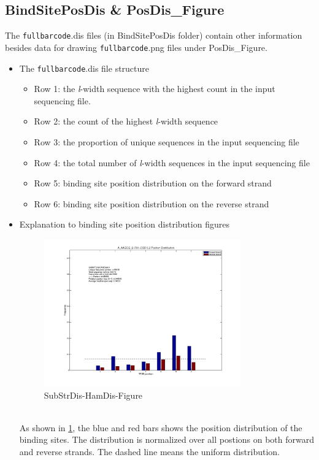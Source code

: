 \documentclass[a4paper,10pt]{article}
\begin{document}
\subsection{BindSitePosDis \& PosDis\_Figure}
The \texttt{fullbarcode}.dis files (in BindSitePosDis folder) contain other information besides data for drawing \texttt{fullbarcode}.png files under PosDis\_Figure.
\begin{itemize}
 \item The \texttt{fullbarcode}.dis file structure
  \begin{itemize}
   \item Row 1: the \textit{l}-width sequence with the highest count in the input sequencing file.
   \item Row 2: the count of the highest \textit{l}-width sequence
   \item Row 3: the proportion of unique sequences in the input sequencing file
   \item Row 4: the total number of \textit{l}-width sequences in the input sequencing file
   \item Row 5: binding site position distribution on the forward strand
   \item Row 6: binding site position distribution on the reverse strand
  \end{itemize}

 \item Explanation to binding site position distribution figures
   \begin{figure}[htp]
    \centering
    \includegraphics[width=0.8\textwidth]{A_AAGCG_21.png}
    \caption{SubStrDis-HamDis-Figure}
    \label{fig:posdisfig}
   \end{figure} \\
 As shown in \figurename{} \ref{fig:posdisfig}, the blue and red bars shows the position distribution of the binding sites.
 The distribution is normalized over all postions on both forward and reverse strands.
 The dashed line means the uniform distribution.
\end{itemize}
\end{document}
